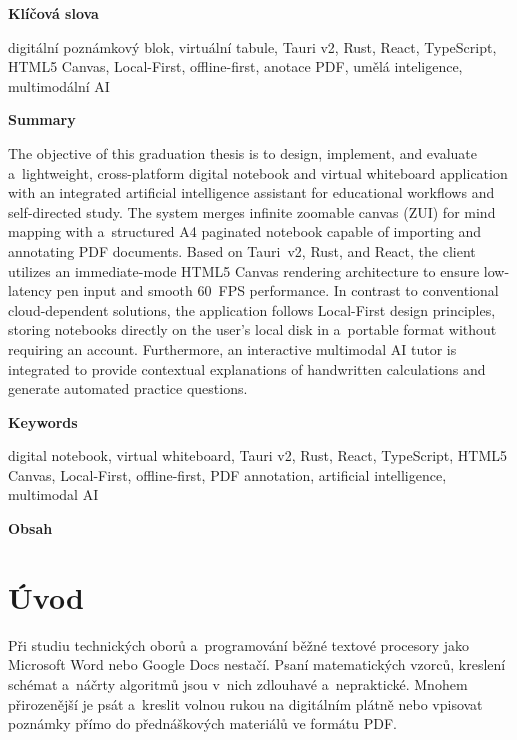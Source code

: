 \documentclass[12pt, a4paper, oneside]{article}
\newcommand{\nadpismimoobsah}[1]{%
    \vspace{6pt}%
    {\normalfont\fontsize{14pt}{18pt}\selectfont\sffamily\bfseries #1\par}%
    \vspace{2pt}%
}
\begin{document}
\nadpismimoobsah{Klíčová slova}
digitální poznámkový blok, virtuální tabule, Tauri v2, Rust, React, TypeScript, HTML5 Canvas, Local-First, offline-first, anotace PDF, umělá inteligence, multimodální AI

\clearpage

\nadpismimoobsah{Summary}
The objective of this graduation thesis is to design, implement, and evaluate a~lightweight, cross-platform digital notebook and virtual whiteboard application with an integrated artificial intelligence assistant for educational workflows and self-directed study. The system merges infinite zoomable canvas (ZUI) for mind mapping with a~structured A4 paginated notebook capable of importing and annotating PDF documents. Based on Tauri~v2, Rust, and React, the client utilizes an immediate-mode HTML5 Canvas rendering architecture to ensure low-latency pen input and smooth 60~FPS performance. In contrast to conventional cloud-dependent solutions, the application follows Local-First design principles, storing notebooks directly on the user's local disk in a~portable format without requiring an account. Furthermore, an interactive multimodal AI tutor is integrated to provide contextual explanations of handwritten calculations and generate automated practice questions.

\nadpismimoobsah{Keywords}
digital notebook, virtual whiteboard, Tauri v2, Rust, React, TypeScript, HTML5 Canvas, Local-First, offline-first, PDF annotation, artificial intelligence, multimodal AI

\clearpage

\nadpismimoobsah{Obsah}
\makeatletter
{}
\makeatother

\clearpage

\section{Úvod}
\label{sec:uvod}

Při studiu technických oborů a~programování běžné textové procesory jako Microsoft Word nebo Google Docs nestačí. Psaní matematických vzorců, kreslení schémat a~náčrty algoritmů jsou v~nich zdlouhavé a~nepraktické. Mnohem přirozenější je psát a~kreslit volnou rukou na digitálním plátně nebo vpisovat poznámky přímo do přednáškových materiálů ve formátu PDF.
\end{document}
